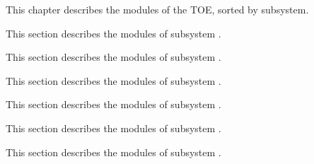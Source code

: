 

This chapter describes the modules of the TOE, sorted by subsystem.



This section describes the modules of subsystem .


\cleardoublepage{}



This section describes the modules of subsystem .




This section describes the modules of subsystem .


\cleardoublepage{}



This section describes the modules of subsystem .


\cleardoublepage{}



This section describes the modules of subsystem .


\cleardoublepage{}

\cleardoublepage{}



This section describes the modules of subsystem .


\cleardoublepage{}




